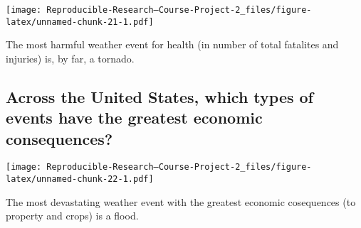 \documentclass[
]{article}
\newenvironment{Shaded}{\begin{snugshade}}{\end{snugshade}}
\newcommand{\CommentTok}[1]{\textcolor[rgb]{0.56,0.35,0.01}{\textit{#1}}}
\newcommand{\DataTypeTok}[1]{\textcolor[rgb]{0.13,0.29,0.53}{#1}}
\newcommand{\FloatTok}[1]{\textcolor[rgb]{0.00,0.00,0.81}{#1}}
\newcommand{\KeywordTok}[1]{\textcolor[rgb]{0.13,0.29,0.53}{\textbf{#1}}}
\newcommand{\NormalTok}[1]{#1}
\newcommand{\OperatorTok}[1]{\textcolor[rgb]{0.81,0.36,0.00}{\textbf{#1}}}
\newcommand{\StringTok}[1]{\textcolor[rgb]{0.31,0.60,0.02}{#1}}
\begin{document}
\texttt{[image: Reproducible-Research---Course-Project-2\_files/figure-latex/unnamed-chunk-21-1.pdf]}

The most harmful weather event for health (in number of total fatalites
and injuries) is, by far, a tornado.

\hypertarget{across-the-united-states-which-types-of-events-have-the-greatest-economic-consequences}{%
\subsection{Across the United States, which types of events have the
greatest economic
consequences?}\label{across-the-united-states-which-types-of-events-have-the-greatest-economic-consequences}}

\begin{Shaded}
\end{Shaded}

\texttt{[image: Reproducible-Research---Course-Project-2\_files/figure-latex/unnamed-chunk-22-1.pdf]}

The most devastating weather event with the greatest economic
cosequences (to property and crops) is a flood.
\end{document}
